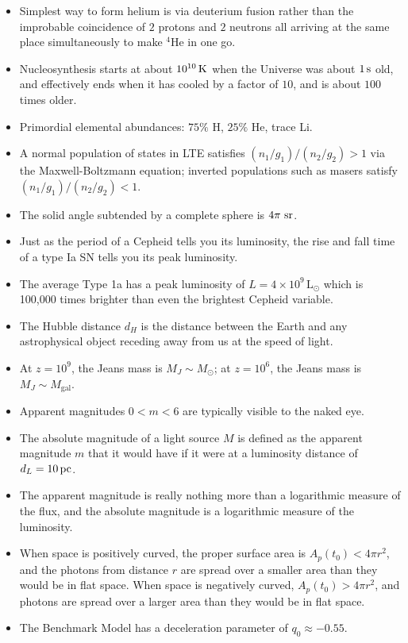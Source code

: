 \documentclass[a4paper,10pt]{article}
\begin{document}
\begin{itemize}
    \item Simplest way to form helium is via deuterium fusion rather than the improbable coincidence of $2$ protons and $2$ neutrons all arriving at the same place simultaneously to make $^4$He in one go.
    \item Nucleosynthesis starts at about $10^{10}\,{\rm K}$ when the Universe was about $1\,{\rm s}$ old, and effectively ends when it has cooled by a factor of $10$, and is about $100$ times older.
    \item Primordial elemental abundances: $75\%$ H, $25\%$ He, trace Li.
    \item A normal population of states in LTE satisfies $(n_1/g_1)/(n_2/g_2)>1$ via the Maxwell-Boltzmann equation; inverted populations such as masers satisfy $(n_1/g_1)/(n_2/g_2)<1$.
    \item The solid angle subtended by a complete sphere is $4\pi~{\rm sr}$.
    \item Just as the period of a Cepheid tells you its luminosity, the rise and fall time of a type Ia SN tells you its peak luminosity.
    \item The average Type 1a has a peak luminosity of $L=4\times10^9\,\mathrm{L}_\odot$ which is 100,000 times brighter than even the brightest Cepheid variable.
    \item The Hubble distance $d_H$ is the distance between the Earth and any astrophysical object receding away from us at the speed of light.
    \item At $z=10^9$, the Jeans mass is $M_J\sim M_\odot$; at $z=10^6$, the Jeans mass is $M_J\sim M_\mathrm{gal}$.
    \item Apparent magnitudes $0<m<6$ are typically visible to the naked eye.
    \item The absolute magnitude of a light source $M$ is defined as the apparent magnitude $m$ that it would have if it were at a luminosity distance of $d_L = 10\,{\rm pc}$.
    \item The apparent magnitude is really nothing more than a logarithmic measure of the flux, and the absolute magnitude is a logarithmic measure of the luminosity.
    \item When space is positively curved, the proper surface area is $A_p(t_0) < 4\pi r^2$, and the photons from distance $r$ are spread over a smaller area than they would be in flat space. When space is negatively curved, $A_p(t_0) > 4\pi r^2$, and photons are spread over a larger area than they would be in flat space.
    \item The Benchmark Model has a deceleration parameter of $q_0\approx−0.55$.

\end{itemize}
\end{document}
